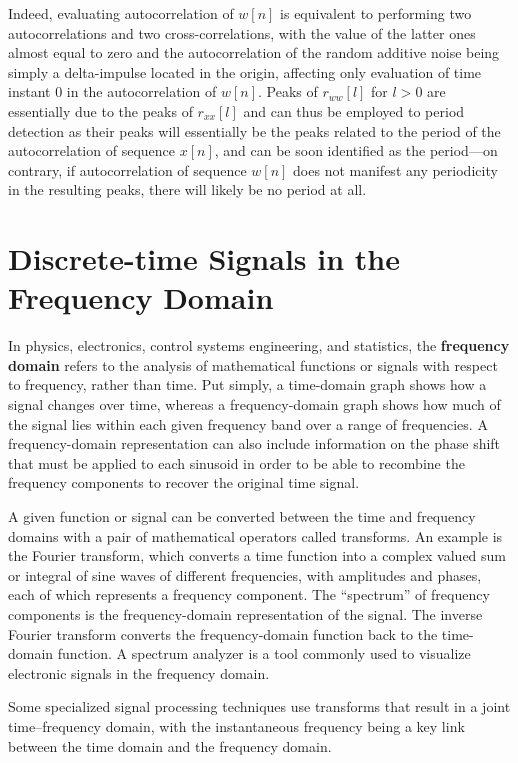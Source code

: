 \documentclass[\documentfontsize, twocolumn]{\classname}
\begin{document}
Indeed, evaluating autocorrelation of $w[n]$ is equivalent to performing two autocorrelations and two cross-correlations, with the value of the latter ones almost equal to zero and the autocorrelation of the random additive noise being simply a delta-impulse located in the origin, affecting only evaluation of time instant $0$ in the autocorrelation of $w[n]$. Peaks of $r_{ww}[l]$ for $l > 0$ are essentially due to the peaks of $r_{xx}[l]$ and can thus be employed to period detection as their peaks will essentially be the peaks related to the period of the autocorrelation of sequence $x[n]$, and can be soon identified as the period---on contrary, if autocorrelation of sequence $w[n]$ does not manifest any periodicity in the resulting peaks, there will likely be no period at all.

\chapter{Discrete-time Signals in the Frequency Domain}
In physics, electronics, control systems engineering, and statistics, the \textbf{frequency domain} refers to the analysis of mathematical functions or signals with respect to frequency, rather than time. Put simply, a time-domain graph shows how a signal changes over time, whereas a frequency-domain graph shows how much of the signal lies within each given frequency band over a range of frequencies. A frequency-domain representation can also include information on the phase shift that must be applied to each sinusoid in order to be able to recombine the frequency components to recover the original time signal.

A given function or signal can be converted between the time and frequency domains with a pair of mathematical operators called transforms. An example is the Fourier transform, which converts a time function into a complex valued sum or integral of sine waves of different frequencies, with amplitudes and phases, each of which represents a frequency component. The ``spectrum'' of frequency components is the frequency-domain representation of the signal. The inverse Fourier transform converts the frequency-domain function back to the time-domain function. A spectrum analyzer is a tool commonly used to visualize electronic signals in the frequency domain.

Some specialized signal processing techniques use transforms that result in a joint time–frequency domain, with the instantaneous frequency being a key link between the time domain and the frequency domain.
\end{document}
